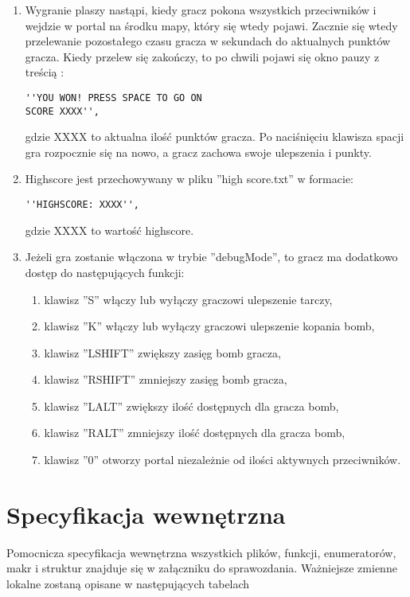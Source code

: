 \documentclass[12pt,a4paper]{article}
\begin{document}
\begin{enumerate}
\item Wygranie plaszy nastąpi, kiedy gracz pokona wszystkich przeciwników i wejdzie w portal na środku mapy, który się wtedy pojawi. Zacznie się wtedy przelewanie pozostałego czasu gracza w sekundach do aktualnych punktów gracza. Kiedy przelew się zakończy, to po chwili pojawi się okno pauzy z treścią :
\begin{verbatim}
''YOU WON! PRESS SPACE TO GO ON 
SCORE XXXX'',
\end{verbatim}
 gdzie XXXX to aktualna ilość punktów gracza. Po naciśnięciu klawisza spacji gra rozpocznie się na nowo, a gracz zachowa swoje ulepszenia i punkty.

\item Highscore jest przechowywany w pliku ''high score.txt'' w formacie: 
\begin{verbatim}
''HIGHSCORE: XXXX'', 
\end{verbatim}
gdzie XXXX to wartość highscore.

\item Jeżeli gra zostanie włączona w trybie ''debugMode'', to gracz ma dodatkowo dostęp do następujących funkcji:
\begin{enumerate}
\item klawisz ''S'' włączy lub wyłączy graczowi ulepszenie tarczy,

\item klawisz ''K'' włączy lub wyłączy graczowi ulepszenie kopania bomb,

\item klawisz ''LSHIFT'' zwiększy zasięg bomb gracza,

\item klawisz ''RSHIFT'' zmniejszy zasięg bomb gracza,

\item klawisz  ''LALT'' zwiększy ilość dostępnych dla gracza bomb,

\item klawisz ''RALT'' zmniejszy ilość dostępnych dla gracza bomb,

\item klawisz ''0'' otworzy portal niezależnie od ilości aktywnych przeciwników.
\end{enumerate}
\end{enumerate}

\section{Specyfikacja wewnętrzna}\label{sec:sp-wew}
Pomocnicza specyfikacja wewnętrzna wszystkich plików, funkcji, enumeratorów, makr i struktur znajduje się w załączniku do sprawozdania.
Ważniejsze zmienne lokalne zostaną opisane w następujących tabelach
\end{document}
